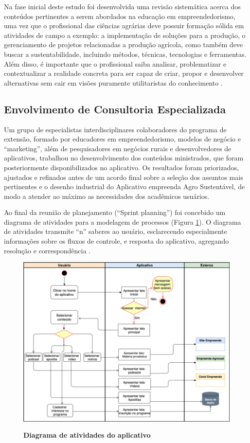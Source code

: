 Na fase inicial deste estudo foi desenvolvida uma revisão sistemática acerca dos conteúdos pertinentes a serem abordados na educação em empreendedorismo, uma vez que o profissional das ciências agrárias deve possuir formação sólida em atividades de campo a exemplo: a implementação de soluções para a produção, o gerenciamento de projetos relacionadas a produção agrícola, como também deve buscar a sustentabilidade, incluindo métodos, técnicas, tecnologias e ferramentas. Além disso, é importante que o profissional saiba analisar, problematizar e contextualizar a realidade concreta para ser capaz de criar, propor e desenvolver alternativas sem cair em visões puramente utilitaristas do conhecimento \cite{cavalcanti_da_2019}.

\subsection{Envolvimento de Consultoria Especializada}

Um grupo de especialistas interdisciplinares colaboradores do programa de extensão, formado por educadores em empreendedorismo, modelos de negócio e “marketing”, além de pesquisadores em negócios rurais e desenvolvedores de aplicativos, trabalhou no desenvolvimento dos conteúdos ministrados, que foram posteriormente disponibilizados no aplicativo. Os resultados foram priorizados, ajustados e refinados antes de um acordo final sobre a seleção dos assuntos mais pertinentes e o desenho industrial do Aplicativo empreenda Agro Sustentável, de modo a atender ao máximo as necessidades dos acadêmicos usuários.

Ao final da reunião de planejamento (“Sprint planning”) foi concebido um diagrama de atividades para a modelagem de processos (Figura \ref{figura_diagrama}). O diagrama de atividades transmite “n” saberes ao usuário, esclarecendo especialmente informações sobre os fluxos de controle, e resposta do aplicativo, agregando resolução e correspondência \cite{pressman_engenharia_2016}.

\begin{figure}[H]
\centering
\caption{\textbf{Diagrama de atividades do aplicativo}}
\includegraphics[scale=0.4]{Imagens/diagrama_aplicativo.png}
\label{figura_diagrama}
\end{figure}


